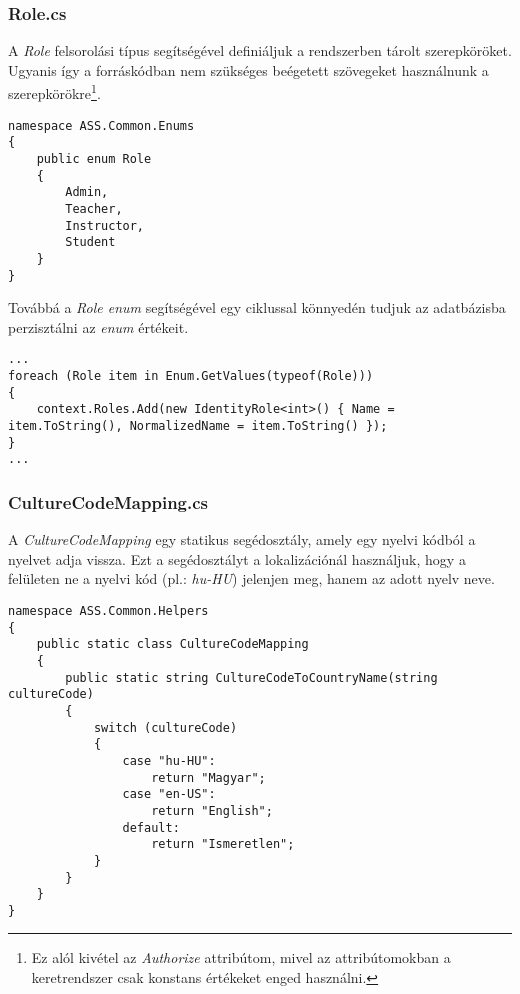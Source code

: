 \subsubsection{Role.cs}
A \emph{Role} felsorolási típus segítségével definiáljuk a rendszerben tárolt szerepköröket. Ugyanis így a forráskódban nem szükséges beégetett szövegeket használnunk a szerepkörökre\footnote{Ez alól kivétel az \emph{Authorize} attribútom, mivel az attribútomokban a keretrendszer csak konstans értékeket enged használni.}.
\begin{lstlisting}[language={[Sharp]C}]
namespace ASS.Common.Enums
{
	public enum Role
	{
		Admin,
		Teacher,
		Instructor,
		Student
	}
}
\end{lstlisting}
Továbbá a \emph{Role enum} segítségével egy ciklussal könnyedén tudjuk az adatbázisba perzisztálni az \emph{enum} értékeit.
\begin{lstlisting}[language={[Sharp]C}]
...
foreach (Role item in Enum.GetValues(typeof(Role)))
{
	context.Roles.Add(new IdentityRole<int>() { Name = item.ToString(), NormalizedName = item.ToString() });
}
...
\end{lstlisting}
\subsubsection{CultureCodeMapping.cs}
A \emph{CultureCodeMapping} egy statikus segédosztály, amely egy nyelvi kódból a nyelvet adja vissza. Ezt a segédosztályt a lokalizációnál használjuk, hogy a felületen ne a nyelvi kód (pl.: \emph{hu-HU}) jelenjen meg, hanem az adott nyelv neve.
\begin{lstlisting}[language={[Sharp]C}]
namespace ASS.Common.Helpers
{
	public static class CultureCodeMapping
	{
		public static string CultureCodeToCountryName(string cultureCode)
		{
			switch (cultureCode)
			{
				case "hu-HU":
					return "Magyar";
				case "en-US":
					return "English";
				default:
					return "Ismeretlen";
			}
		}
	}
}
\end{lstlisting}
